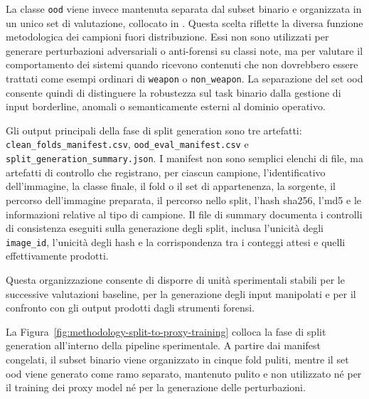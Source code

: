 La classe \texttt{ood} viene invece mantenuta separata dal subset binario e
organizzata in un unico set di valutazione, collocato in
. Questa scelta riflette la
diversa funzione metodologica dei campioni fuori distribuzione. Essi non sono
utilizzati per generare perturbazioni adversariali o anti-forensi su classi
note, ma per valutare il comportamento dei sistemi quando ricevono contenuti
che non dovrebbero essere trattati come esempi ordinari di \texttt{weapon} o
\texttt{non\_weapon}. La separazione del set \gls{ood} consente quindi di
distinguere la robustezza sul task binario dalla gestione di input borderline,
anomali o semanticamente esterni al dominio operativo.

Gli output principali della fase di split generation sono tre artefatti:
\texttt{clean\_folds\_manifest.csv}, \texttt{ood\_eval\_manifest.csv} e
\texttt{split\_generation\_summary.json}. I manifest non sono semplici elenchi
di file, ma artefatti di controllo che registrano, per ciascun campione,
l'identificativo dell'immagine, la classe finale, il fold o il set di
appartenenza, la sorgente, il percorso dell'immagine preparata, il percorso
nello split, l'hash \gls{sha256}, l'\gls{md5} e le informazioni relative al tipo di
campione. Il file di summary documenta i controlli di consistenza eseguiti
sulla generazione degli split, inclusa l'unicità degli \texttt{image\_id},
l'unicità degli hash e la corrispondenza tra i conteggi attesi e quelli
effettivamente prodotti.

Questa organizzazione consente di disporre di unità sperimentali stabili per
le successive valutazioni baseline, per la generazione degli input manipolati e
per il confronto con gli output prodotti dagli strumenti forensi.


La Figura~\ref{fig:methodology-split-to-proxy-training} colloca la fase di
split generation all'interno della pipeline sperimentale. A partire dai manifest
congelati, il subset binario viene organizzato in cinque fold puliti, mentre il
set \gls{ood} viene generato come ramo separato, mantenuto pulito e non
utilizzato né per il training dei proxy model né per la generazione delle
perturbazioni.

